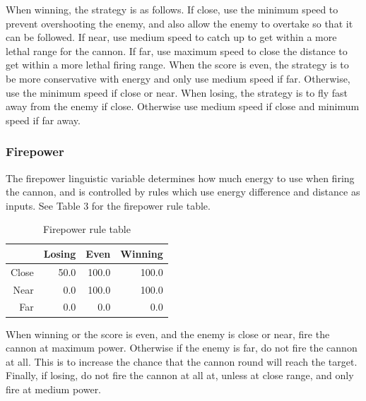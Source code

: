 When winning, the strategy is as follows. If close, use the minimum speed to prevent overshooting the enemy, and also allow the enemy to overtake so that it can be followed. If near, use medium speed to catch up to get within a more lethal range for the cannon. If far, use maximum speed to close the distance to get within a more lethal firing range. When the score is even, the strategy is to be more conservative with energy and only use medium speed if far. Otherwise, use the minimum speed if close or near. When losing, the strategy is to fly fast away from the enemy if close. Otherwise use medium speed if close and minimum speed if far away.

\subsubsection{Firepower}

The firepower linguistic variable determines how much energy to use when firing the cannon, and is controlled by rules which use energy difference and distance as inputs. See Table 3 for the firepower rule table.

\begin{table}[H]
\centering
\caption{Firepower rule table}
\label{Firepower rule table}
\begin{tabular}{r|r|r|r}
 		& Losing 	& Even 		& Winning	\\ \hline
Close	& 50.0		& 100.0 	& 100.0		\\
Near	& 0.0 		& 100.0 	& 100.0		\\
Far		& 0.0 		& 0.0 		& 0.0		\\
\end{tabular}
\end{table}

When winning or the score is even, and the enemy is close or near, fire the cannon at maximum power. Otherwise if the enemy is far, do not fire the cannon at all. This is to increase the chance that the cannon round will reach the target. Finally, if losing, do not fire the cannon at all at, unless at close range, and only fire at medium power.